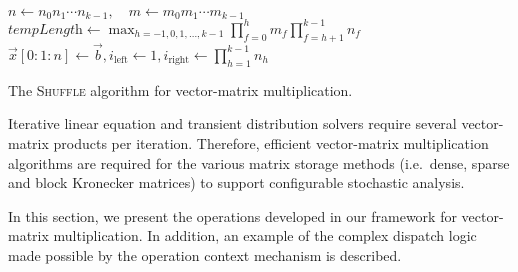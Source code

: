 \begin{algorithm}
  $n \gets n_0 n_1 \cdots n_{k - 1},\quad m \gets m_0 m_1 \cdots m_{k - 1}$\;
  $\textit{tempLength} \gets \max_{h = -1, 0, 1, \ldots, k - 1} \prod_{f =
    0}^h m_f \prod_{f = h + 1}^{k - 1} n_f$\;
  \;
  $\vec{x}[0{:}1{:}n] \gets \vec{b},
  i_{\text{left}} \gets 1,
  i_{\text{right}} \gets \prod_{h = 1}^{k - 1} n_h$
  \;
  \caption{The \textsc{Shuffle} algorithm for vector-matrix
    multiplication.}
  \label{alg:algorithms:matmul:shuffle}
\end{algorithm}

Iterative linear equation and transient distribution solvers require
several vector-matrix products per iteration. Therefore, efficient
vector-matrix multiplication algorithms are required for the various
matrix storage methods (i.e.~dense, sparse and block Kronecker
matrices) to support configurable stochastic analysis.

In this section, we present the operations developed in our framework
for vector-matrix multiplication. In addition, an example of the
complex dispatch logic made possible by the operation context
mechanism is described.

